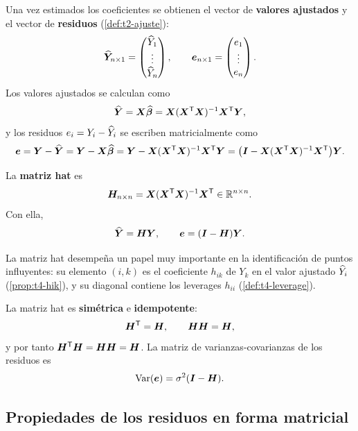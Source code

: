 Una vez estimados los coeficientes se obtienen el vector de \textbf{valores ajustados} y el
vector de \textbf{residuos} (\cref{def:t2-ajuste}):
\[
  \widehat{\bm{Y}}_{n\times1} = \begin{pmatrix} \widehat{Y}_1\\ \vdots\\ \widehat{Y}_n \end{pmatrix},
  \qquad
  \bm{e}_{n\times1} = \begin{pmatrix} e_1\\ \vdots\\ e_n \end{pmatrix}.
\]
Los valores ajustados se calculan como
\[
  \widehat{\bm{Y}} = \bm{X}\widehat{\bm{\beta}} = \bm{X}(\bm{X}^{\mathsf{T}}\bm{X})^{-1}\bm{X}^{\mathsf{T}}\bm{Y},
\]
y los residuos $e_i=Y_i-\widehat{Y}_i$ se escriben matricialmente como
\[
  \bm{e} = \bm{Y}-\widehat{\bm{Y}} = \bm{Y}-\bm{X}\widehat{\bm{\beta}}
  = \bm{Y}-\bm{X}(\bm{X}^{\mathsf{T}}\bm{X})^{-1}\bm{X}^{\mathsf{T}}\bm{Y}
  = \big(\bm{I}-\bm{X}(\bm{X}^{\mathsf{T}}\bm{X})^{-1}\bm{X}^{\mathsf{T}}\big)\bm{Y} .
\]

\begin{definicion}
  La \textbf{matriz hat} es
  \[
    \bm{H}_{n\times n} = \bm{X}(\bm{X}^{\mathsf{T}}\bm{X})^{-1}\bm{X}^{\mathsf{T}} \in\mathbb{R}^{n\times n} .
  \]
  Con ella,
  \[
    \widehat{\bm{Y}} = \bm{H}\bm{Y}, \qquad \bm{e} = (\bm{I}-\bm{H})\bm{Y} .
  \]
\end{definicion}

La matriz hat desempeña un papel muy importante en la identificación de puntos influyentes: su
elemento $(i,k)$ es el coeficiente $h_{ik}$ de $Y_k$ en el valor ajustado $\widehat{Y}_i$
(\cref{prop:t4-hik}), y su diagonal contiene los leverages $h_{ii}$ (\cref{def:t4-leverage}).

\begin{proposicion}
  La matriz hat es \textbf{simétrica} e \textbf{idempotente}:
  \[
    \bm{H}^{\mathsf{T}}=\bm{H}, \qquad \bm{H}\bm{H}=\bm{H},
  \]
  y por tanto $\bm{H}^{\mathsf{T}}\bm{H}=\bm{H}\bm{H}=\bm{H}$. La matriz de varianzas-covarianzas de
  los residuos es
  \[
    \operatorname{Var}(\bm{e}) = \sigma^2(\bm{I}-\bm{H}) .
  \]
\end{proposicion}

\subsection{Propiedades de los residuos en forma matricial}

